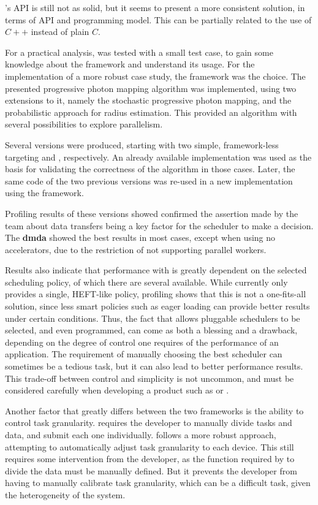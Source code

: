 \documentclass[main.tex]{subfiles}
\begin{document}
\gama's API is still not as solid, but it seems to present a more consistent solution, in terms of API and programming model. This can be partially related to the use of $C++$ instead of plain $C$.


For a practical analysis, \gama was tested with a small test case, to gain some knowledge about the framework and understand its usage. For the implementation of a more robust case study, the \starpu framework was the choice. The presented progressive photon mapping algorithm was implemented, using two extensions to it, namely the stochastic progressive photon mapping, and the probabilistic approach for radius estimation. This provided an algorithm with several possibilities to explore parallelism.

Several versions were produced, starting with two simple, framework-less targeting \cpus and \gpus, respectively. An already available implementation was used as the basis for validating the correctness of the algorithm in those cases. Later, the same code of the two previous versions was re-used in a new implementation using the \starpu framework.

Profiling results of these versions showed confirmed the assertion made by the \starpu team about data transfers being a key factor for the scheduler to make a decision. The \textbf{dmda} showed the best results in most cases, except when using no accelerators, due to the restriction of not supporting parallel workers.

Results also indicate that performance with \starpu is greatly dependent on the selected scheduling policy, of which there are several available. While \gama currently only provides a single, \acs{HEFT}-like policy, profiling shows that this is not a one-fits-all solution, since less smart policies such as eager loading can provide better results under certain conditions. Thus, the fact that \starpu allows pluggable schedulers to be selected, and even programmed, can come as both a blessing and a drawback, depending on the degree of control one requires of the performance of an application. The requirement of manually choosing the best scheduler can sometimes be a tedious task, but it can also lead to better performance results. This trade-off between control and simplicity is not uncommon, and must be considered carefully when developing a product such as \starpu or \gama.

Another factor that greatly differs between the two frameworks is the ability to control task granularity. \starpu requires the developer to manually divide tasks and data, and submit each one individually. \gama follows a more robust approach, attempting to automatically adjust task granularity to each device. This still requires some intervention from the developer, as the function required by \gama to divide the data must be manually defined. But it prevents the developer from having to manually calibrate task granularity, which can be a difficult task, given the heterogeneity of the system.
\end{document}
